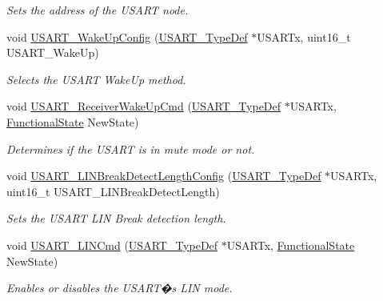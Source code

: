 \begin{DoxyCompactItemize}
\begin{DoxyCompactList}\small\item\em Sets the address of the U\+S\+A\+RT node. \end{DoxyCompactList}\item 
void \hyperlink{group___u_s_a_r_t___private___functions_ga4965417c2412c36e462fcad50a8d5393}{U\+S\+A\+R\+T\+\_\+\+Wake\+Up\+Config} (\hyperlink{struct_u_s_a_r_t___type_def}{U\+S\+A\+R\+T\+\_\+\+Type\+Def} $\ast$U\+S\+A\+R\+Tx, uint16\+\_\+t U\+S\+A\+R\+T\+\_\+\+Wake\+Up)
\begin{DoxyCompactList}\small\item\em Selects the U\+S\+A\+RT Wake\+Up method. \end{DoxyCompactList}\item 
void \hyperlink{group___u_s_a_r_t___private___functions_gac27b78ce445a16fe33851d2f87781c02}{U\+S\+A\+R\+T\+\_\+\+Receiver\+Wake\+Up\+Cmd} (\hyperlink{struct_u_s_a_r_t___type_def}{U\+S\+A\+R\+T\+\_\+\+Type\+Def} $\ast$U\+S\+A\+R\+Tx, \hyperlink{group___exported__types_gac9a7e9a35d2513ec15c3b537aaa4fba1}{Functional\+State} New\+State)
\begin{DoxyCompactList}\small\item\em Determines if the U\+S\+A\+RT is in mute mode or not. \end{DoxyCompactList}\item 
void \hyperlink{group___u_s_a_r_t___private___functions_ga7bc2d291831cbc5e53e73337308029b5}{U\+S\+A\+R\+T\+\_\+\+L\+I\+N\+Break\+Detect\+Length\+Config} (\hyperlink{struct_u_s_a_r_t___type_def}{U\+S\+A\+R\+T\+\_\+\+Type\+Def} $\ast$U\+S\+A\+R\+Tx, uint16\+\_\+t U\+S\+A\+R\+T\+\_\+\+L\+I\+N\+Break\+Detect\+Length)
\begin{DoxyCompactList}\small\item\em Sets the U\+S\+A\+RT L\+IN Break detection length. \end{DoxyCompactList}\item 
void \hyperlink{group___u_s_a_r_t___private___functions_ga9fdd6296f4ca4acdfcbd58bf56bd4185}{U\+S\+A\+R\+T\+\_\+\+L\+I\+N\+Cmd} (\hyperlink{struct_u_s_a_r_t___type_def}{U\+S\+A\+R\+T\+\_\+\+Type\+Def} $\ast$U\+S\+A\+R\+Tx, \hyperlink{group___exported__types_gac9a7e9a35d2513ec15c3b537aaa4fba1}{Functional\+State} New\+State)
\begin{DoxyCompactList}\small\item\em Enables or disables the U\+S\+A\+R\+T�s L\+IN mode. \end{DoxyCompactList}\item 

\end{DoxyCompactItemize}
